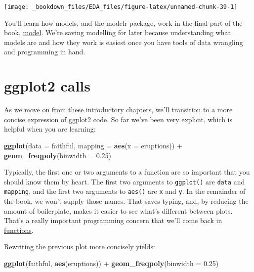 \documentclass[]{book}
\newenvironment{Shaded}{\begin{snugshade}}{\end{snugshade}}
\newcommand{\KeywordTok}[1]{\textcolor[rgb]{0.13,0.29,0.53}{\textbf{{#1}}}}
\newcommand{\DataTypeTok}[1]{\textcolor[rgb]{0.13,0.29,0.53}{{#1}}}
\newcommand{\FloatTok}[1]{\textcolor[rgb]{0.00,0.00,0.81}{{#1}}}
\newcommand{\StringTok}[1]{\textcolor[rgb]{0.31,0.60,0.02}{{#1}}}
\newcommand{\NormalTok}[1]{{#1}}
\begin{document}
\begin{center}\texttt{[image: \_bookdown\_files/EDA\_files/figure-latex/unnamed-chunk-39-1]} \end{center}

You'll learn how models, and the modelr package, work in the final part
of the book, \protect\hyperlink{model-intro}{model}. We're saving
modelling for later because understanding what models are and how they
work is easiest once you have tools of data wrangling and programming in
hand.

\section{ggplot2 calls}\label{ggplot2-calls}

As we move on from these introductory chapters, we'll transition to a
more concise expression of ggplot2 code. So far we've been very
explicit, which is helpful when you are learning:

\begin{Shaded}
\begin{Highlighting}[]
\KeywordTok{ggplot}\NormalTok{(}\DataTypeTok{data =} \NormalTok{faithful, }\DataTypeTok{mapping =} \KeywordTok{aes}\NormalTok{(}\DataTypeTok{x =} \NormalTok{eruptions)) +}\StringTok{ }
\StringTok{  }\KeywordTok{geom_freqpoly}\NormalTok{(}\DataTypeTok{binwidth =} \FloatTok{0.25}\NormalTok{)}
\end{Highlighting}
\end{Shaded}

Typically, the first one or two arguments to a function are so important
that you should know them by heart. The first two arguments to
\texttt{ggplot()} are \texttt{data} and \texttt{mapping}, and the first
two arguments to \texttt{aes()} are \texttt{x} and \texttt{y}. In the
remainder of the book, we won't supply those names. That saves typing,
and, by reducing the amount of boilerplate, makes it easier to see
what's different between plots. That's a really important programming
concern that we'll come back in
\protect\hyperlink{functions}{functions}.

Rewriting the previous plot more concisely yields:

\begin{Shaded}
\begin{Highlighting}[]
\KeywordTok{ggplot}\NormalTok{(faithful, }\KeywordTok{aes}\NormalTok{(eruptions)) +}\StringTok{ }
\StringTok{  }\KeywordTok{geom_freqpoly}\NormalTok{(}\DataTypeTok{binwidth =} \FloatTok{0.25}\NormalTok{)}
\end{Highlighting}
\end{Shaded}
\end{document}

